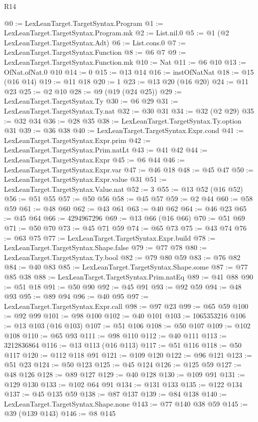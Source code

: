 \begin{lexlean}{R14}
\begin{coremodule}
@0 := LexLeanTarget.TargetSyntax.Program
@1 := LexLeanTarget.TargetSyntax.Program.mk
@2 := List.nil.{0}
@5 := @1 (@2 LexLeanTarget.TargetSyntax.Adt)
@6 := List.cons.{0}
@7 := LexLeanTarget.TargetSyntax.Function
@8 := @6 @7
@9 := LexLeanTarget.TargetSyntax.Function.mk
@10 := Nat
@11 := @6 @10
@13 := OfNat.ofNat.{0} @10
@14 := 0
@15 := @13 @14
@16 := instOfNatNat
@18 := @15 (@16 @14)
@19 := @11 @18
@20 := 1
@23 := @13 @20 (@16 @20)
@24 := @11 @23
@25 := @2 @10
@28 := @9 (@19 (@24 @25))
@29 := LexLeanTarget.TargetSyntax.Ty
@30 := @6 @29
@31 := LexLeanTarget.TargetSyntax.Ty.nat
@32 := @30 @31
@34 := @32 (@2 @29)
@35 := @32 @34
@36 := @28 @35
@38 := LexLeanTarget.TargetSyntax.Ty.option @31
@39 := @36 @38
@40 := LexLeanTarget.TargetSyntax.Expr.cond
@41 := LexLeanTarget.TargetSyntax.Expr.prim
@42 := LexLeanTarget.TargetSyntax.Prim.natLt
@43 := @41 @42
@44 := LexLeanTarget.TargetSyntax.Expr
@45 := @6 @44
@46 := LexLeanTarget.TargetSyntax.Expr.var
@47 := @46 @18
@48 := @45 @47
@50 := LexLeanTarget.TargetSyntax.Expr.value @31
@51 := LexLeanTarget.TargetSyntax.Value.nat
@52 := 3
@55 := @13 @52 (@16 @52)
@56 := @51 @55
@57 := @50 @56
@58 := @45 @57
@59 := @2 @44
@60 := @58 @59
@61 := @48 @60
@62 := @43 @61
@63 := @40 @62
@64 := @46 @23
@65 := @45 @64
@66 := 4294967296
@69 := @13 @66 (@16 @66)
@70 := @51 @69
@71 := @50 @70
@73 := @45 @71 @59
@74 := @65 @73
@75 := @43 @74
@76 := @63 @75
@77 := LexLeanTarget.TargetSyntax.Expr.build
@78 := LexLeanTarget.TargetSyntax.Shape.false
@79 := @77 @78
@80 := LexLeanTarget.TargetSyntax.Ty.bool
@82 := @79 @80 @59
@83 := @76 @82
@84 := @40 @83
@85 := LexLeanTarget.TargetSyntax.Shape.some
@87 := @77 @85 @38
@88 := LexLeanTarget.TargetSyntax.Prim.natEq
@89 := @41 @88
@90 := @51 @18
@91 := @50 @90
@92 := @45 @91
@93 := @92 @59
@94 := @48 @93
@95 := @89 @94
@96 := @40 @95
@97 := LexLeanTarget.TargetSyntax.Expr.call
@98 := @97 @23
@99 := @65 @59
@100 := @92 @99
@101 := @98 @100
@102 := @40 @101
@103 := 1065353216
@106 := @13 @103 (@16 @103)
@107 := @51 @106
@108 := @50 @107
@109 := @102 @108
@110 := @65 @93
@111 := @98 @110
@112 := @40 @111
@113 := 3212836864
@116 := @13 @113 (@16 @113)
@117 := @51 @116
@118 := @50 @117
@120 := @112 @118 @91
@121 := @109 @120
@122 := @96 @121
@123 := @51 @23
@124 := @50 @123
@125 := @45 @124
@126 := @125 @59
@127 := @48 @126
@128 := @89 @127
@129 := @40 @128
@130 := @109 @91
@131 := @129 @130
@133 := @102 @64 @91
@134 := @131 @133
@135 := @122 @134
@137 := @45 @135 @59
@138 := @87 @137
@139 := @84 @138
@140 := LexLeanTarget.TargetSyntax.Shape.none
@143 := @77 @140 @38 @59
@145 := @39 (@139 @143)
@146 := @8 @145

\end{coremodule}
\end{lexlean}
